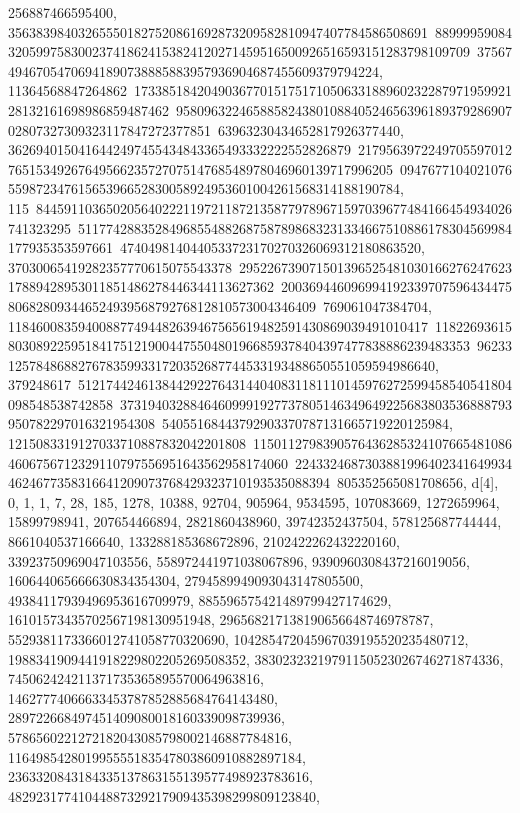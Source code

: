 {{{256887466595400, 356383984032655501827520861692873209582810947407784586508691\
88999959084320599758300237418624153824120271459516500926516593151283798109709\
3756749467054706941890738885883957936904687455609379794224, 11364568847264862\
17338518420490367701517517105063318896023228797195992128132161698986859487462\
95809632246588582438010884052465639618937928690702807327309323117847272377851\
63963230434652817926377440, 3626940150416442497455434843365493332222552826879\
21795639722497055970127651534926764956623572707514768548978046960139717996205\
094767710402107655987234761565396652830058924953601004261568314188190784, 115\
84459110365020564022211972118721358779789671597039677484166454934026741323295\
51177428835284968554882687587898683231334667510886178304569984177935353597661\
4740498140440533723170270326069312180863520, 37030065419282357770615075543378\
29522673907150139652548103016627624762317889428953011851486278446344113627362\
20036944609699419233970759643447580682809344652493956879276812810573004346409\
769061047384704, 118460083594008877494482639467565619482591430869039491010417\
11822693615803089225951841751219004475504801966859378404397477838886239483353\
962331257848688276783599331720352687744533193488650551059594986640, 379248617\
51217442461384429227643144040831181110145976272599458540541804098548538742858\
37319403288464609991927737805146349649225683803536888793950782297016321954308\
54055168443792903370787131665719220125984, 1215083319127033710887832042201808\
11501127983905764362853241076654810864606756712329110797556951643562958174060\
22433246873038819964023416499344624677358316641209073768429323710193535088394\
805352565081708656}}, {d[4], {0, 1, 1, 7, 28, 185, 1278, 10388, 92704, 
   905964, 9534595, 107083669, 1272659964, 15899798941, 207654466894, 
   2821860438960, 39742352437504, 578125687744444, 8661040537166640, 
   133288185368672896, 2102422262432220160, 33923750969047103556, 
   558972441971038067896, 9390960308437216019056, 160644065666630834354304, 
   2794589949093043147805500, 49384117939496953616709979, 
   885596575421489799427174629, 16101573435702567198130951948, 
   296568217138190656648746978787, 5529381173366012741058770320690, 
   104285472045967039195520235480712, 1988341909441918229802205269508352, 
   38302323219791150523026746271874336, 745062424211371735365895570064963816, 
   14627774066633453787852885684764143480, 
   289722668497451409080018160339098739936, 
   5786560221272182043085798002146887784816, 
   116498542801995555183547803860910882897184, 
   2363320843184335137863155139577498923783616, 
   48292317741044887329217909435398299809123840, 
}}}
